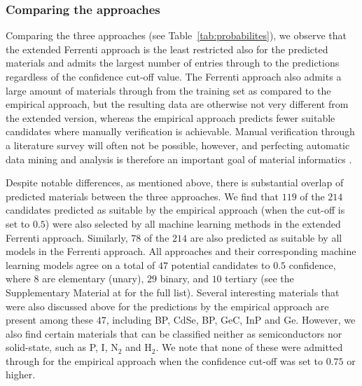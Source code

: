 \documentclass[superscriptaddress,unsortedaddress,
 amsmath,amssymb,
 aps,
]{revtex4-2}
\begin{document}
\subsubsection*{Comparing the approaches}
Comparing the three approaches (see Table~\ref{tab:probabilites}), we observe  that the extended Ferrenti approach is the least restricted also for the predicted materials and admits the largest number of entries through to the predictions regardless of the confidence cut-off value. The Ferrenti approach also admits a large amount of materials through from the training set as compared to the empirical approach, but the resulting data are otherwise not very different from the extended version, whereas the empirical approach predicts fewer suitable candidates where manually verification is achievable. Manual verification through a literature survey will often not be possible, however, and perfecting automatic data mining and analysis is therefore an important goal of material informatics \cite{rickman2019}. 

Despite notable differences, as mentioned above, there is substantial overlap of predicted materials between the three approaches. 
We find that $119$ of the $214$ candidates predicted as suitable by the empirical approach (when the cut-off is set to $0.5$) were also selected by all machine learning methods in the extended Ferrenti approach. 
Similarly, $78$ of the $214$ are also predicted as suitable by all models in the Ferrenti approach. All approaches and their corresponding machine learning models agree on a total of $47$ potential candidates to $0.5$ confidence, where $8$ are elementary (unary), $29$ binary, and $10$ tertiary  
(see the Supplementary Material at \cite{supplementary} for the full list). 
Several interesting materials that were also discussed above for the predictions by the empirical approach are present among these $47$, including BP, CdSe, BP, GeC, InP and Ge. However, we also find certain materials that can be classified neither as semiconductors nor solid-state, such as P, I, N$_2$ and H$_2$. We note that none of these were admitted through for the empirical approach when the confidence cut-off was set to $0.75$ or higher. 
\end{document}

